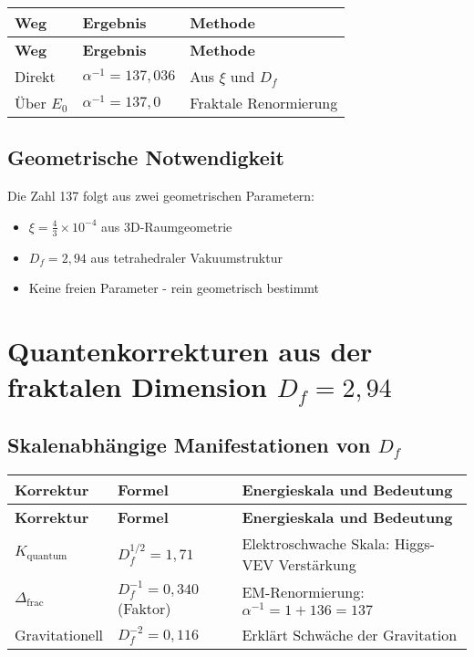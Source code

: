 \documentclass[12pt,a4paper]{article}
\begin{document}
\begin{longtable}{|p{3cm}|p{3cm}|p{5cm}|}
	\hline
	\textbf{Weg} & \textbf{Ergebnis} & \textbf{Methode} \\
	\hline
	\endfirsthead
	\hline
	\textbf{Weg} & \textbf{Ergebnis} & \textbf{Methode} \\
	\hline
	\endhead
	Direkt & \(\alpha^{-1} = 137{,}036\) & Aus \(\xi\) und \(D_f\) \\
	\hline
	Über \(E_0\) & \(\alpha^{-1} = 137{,}0\) & Fraktale Renormierung \\
	\hline
\end{longtable}

\subsection{Geometrische Notwendigkeit}

Die Zahl 137 folgt aus zwei geometrischen Parametern:
\begin{itemize}
	\item \(\xi = \frac{4}{3} \times 10^{-4}\) aus 3D-Raumgeometrie
	\item \(D_f = 2{,}94\) aus tetrahedraler Vakuumstruktur
	\item Keine freien Parameter - rein geometrisch bestimmt
\end{itemize}
\section{Quantenkorrekturen aus der fraktalen Dimension \(D_f = 2{,}94\)}

\subsection{Skalenabhängige Manifestationen von \(D_f\)}

\begin{longtable}{|p{4cm}|p{3cm}|p{6cm}|}
	\hline
	\textbf{Korrektur} & \textbf{Formel} & \textbf{Energieskala und Bedeutung} \\
	\hline
	\endfirsthead
	\hline
	\textbf{Korrektur} & \textbf{Formel} & \textbf{Energieskala und Bedeutung} \\
	\hline
	\endhead
	\(K_{\text{quantum}}\) & \(D_f^{1/2} = 1{,}71\) & Elektroschwache Skala: Higgs-VEV Verstärkung \\
	\hline
	\(\Delta_{\text{frac}}\) & \(D_f^{-1} = 0{,}340\) (Faktor) & EM-Renormierung: \(\alpha^{-1} = 1 + 136 = 137\) \\
	\hline
	Gravitationell & \(D_f^{-2} = 0{,}116\) & Erklärt Schwäche der Gravitation \\
	\hline
\end{longtable}
\end{document}
